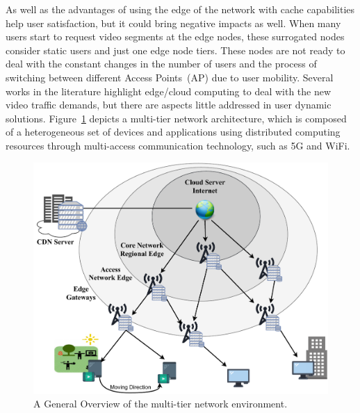 As well as the advantages of using the edge of the network with cache capabilities help user satisfaction, but it could bring negative impacts as well. When many users start to request video segments at the edge nodes, these surrogated nodes consider static users and just one edge node tiers. These nodes are not ready to deal with the constant changes in the number of users and the process of switching between different Access Points~(AP) due to user mobility.
Several works in the literature highlight edge/cloud computing to deal with the new video traffic demands, but there are aspects little addressed in user dynamic solutions. Figure~\ref{fig:multi-tier-network} depicts a multi-tier network architecture, which is composed of a heterogeneous set of devices and applications using distributed computing resources through multi-access communication technology, such as 5G and WiFi.
%
%


\begin{figure}
    \centering
    \includegraphics[width=\linewidth]{images/arch-video-content-2.pdf}
    \caption{A General Overview of the multi-tier network environment.}
    \label{fig:multi-tier-network}
\end{figure}

